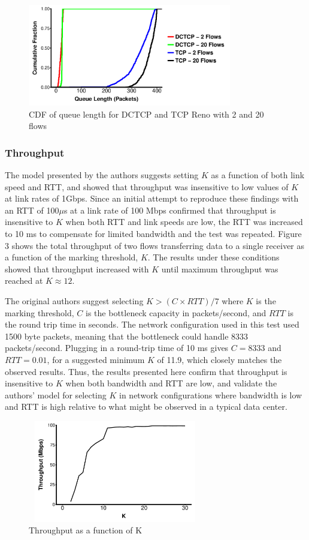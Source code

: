 \begin{figure}
\includegraphics[height=1.75in,width=3.5in]{queue_cdf}
\caption{CDF of queue length for DCTCP and TCP Reno with 2 and 20 flows}
\end{figure}

\subsubsection{Throughput}

The model presented by the authors suggests setting $K$ as a function of both link speed and RTT, and showed that throughput was insensitive to low values of $K$ at link rates of 1Gbps. Since an initial attempt to reproduce these findings with an RTT of 100$\mu$s at a link rate of 100 Mbps confirmed that throughput is insensitive to $K$ when both RTT and link speeds are low, the RTT was increased to 10 ms to compensate for limited bandwidth and the test was repeated. Figure 3 shows the total throughput of two flows transferring data to a single receiver as a function of the marking threshold, $K$. The results under these conditions showed that throughput increased with $K$ until maximum throughput was reached at $K \approx 12$.

The original authors suggest selecting $K > (C \times RTT) / 7$ where $K$ is the marking threshold, $C$ is the bottleneck capacity in packets/second, and $RTT$ is the round trip time in seconds. The network configuration used in this test used 1500 byte packets, meaning that the bottleneck could handle 8333 packets/second. Plugging in a round-trip time of 10 ms gives $C = 8333$ and $RTT = 0.01$, for a suggested minimum $K$ of 11.9, which closely matches the observed results. Thus, the results presented here confirm that throughput is insensitive to $K$ when both bandwidth and RTT are low, and validate the authors' model for selecting $K$ in network configurations where bandwidth is low and RTT is high relative to what might be observed in a typical data center.

\begin{figure}
\includegraphics[height=1.75in,width=3in]{k_throughput_delay}
\caption{Throughput as a function of K}
\end{figure}

